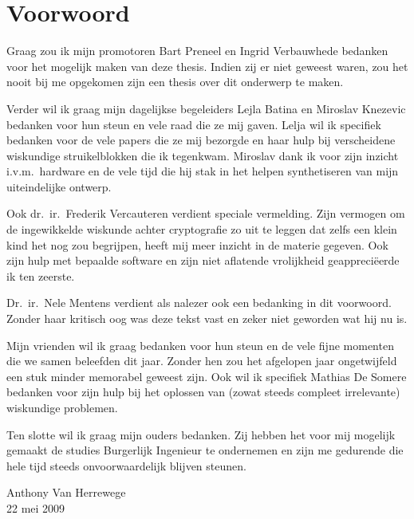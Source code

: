\chapter*{Voorwoord}

Graag zou ik mijn promotoren Bart Preneel en Ingrid Verbauwhede bedanken voor het mogelijk maken van deze thesis. Indien zij er niet geweest waren, zou het nooit bij me opgekomen zijn een thesis over dit onderwerp te maken.

Verder wil ik graag mijn dagelijkse begeleiders Lejla Batina en \mbox{Miroslav} Knezevic bedanken voor hun steun en vele raad die ze mij gaven. Lelja wil ik specifiek bedanken voor de vele papers die ze mij bezorgde en haar hulp bij verscheidene wiskundige struikelblokken die ik tegenkwam. Miroslav dank ik voor zijn inzicht i.v.m.\ hardware en de vele tijd die hij stak in het helpen synthetiseren van mijn uiteindelijke ontwerp.

Ook dr.\ ir.\ Frederik Vercauteren verdient speciale vermelding. Zijn vermogen om de ingewikkelde wiskunde achter cryptografie zo uit te leggen dat zelfs een klein kind het nog zou begrijpen, heeft mij meer inzicht in de materie gegeven. Ook zijn hulp met bepaalde software en zijn niet aflatende vrolijkheid geappreci\"eerde ik ten zeerste.

Dr.\ ir.\ Nele Mentens verdient als nalezer ook een bedanking in dit voorwoord. Zonder haar kritisch oog was deze tekst vast en zeker niet geworden wat hij nu is.

Mijn vrienden wil ik graag bedanken voor hun steun en de vele fijne momenten die we samen beleefden dit jaar. Zonder hen zou het afgelopen jaar ongetwijfeld een stuk minder memorabel geweest zijn. Ook wil ik specifiek Mathias De Somere bedanken voor zijn hulp bij het oplossen van (zowat steeds compleet irrelevante) wiskundige problemen.

Ten slotte wil ik graag mijn ouders bedanken. Zij hebben het voor mij mogelijk gemaakt de studies Burgerlijk Ingenieur te ondernemen en zijn me gedurende die hele tijd steeds onvoorwaardelijk blijven steunen.

\bigskip \bigskip
{\raggedleft	%
Anthony Van Herrewege\\
22 mei 2009\\
}
